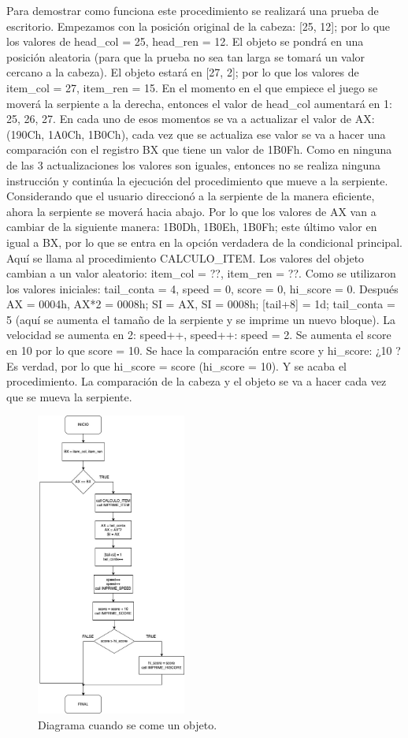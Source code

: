 \documentclass[12pt]{article}
\begin{document}
Para demostrar como funciona este procedimiento se realizará una prueba de escritorio. Empezamos con la posición original de la cabeza: [25, 12]; por lo que los valores de head\_col = 25, head\_ren = 12. El objeto se pondrá en una posición aleatoria (para que la prueba no sea tan larga se tomará un valor cercano a la cabeza). El objeto estará en [27, 2]; por lo que los valores de item\_col = 27, item\_ren = 15. En el momento en el que empiece el juego se moverá la serpiente a la derecha, entonces el valor de head\_col aumentará en 1: 25, 26, 27. En cada uno de esos momentos se va a actualizar el valor de AX: (190Ch, 1A0Ch, 1B0Ch), cada vez que se actualiza ese valor se va a hacer una comparación con el registro BX que tiene un valor de 1B0Fh. Como en ninguna de las 3 actualizaciones los valores son iguales, entonces no se realiza ninguna instrucción y continúa la ejecución del procedimiento que mueve a la serpiente. Considerando que el usuario direccionó a la serpiente de la manera eficiente, ahora la serpiente se moverá hacia abajo. Por lo que los valores de AX van a cambiar de la siguiente manera: 1B0Dh, 1B0Eh, 1B0Fh; este último valor en igual a BX, por lo que se entra en la opción verdadera de la condicional principal. Aquí se llama al procedimiento CALCULO\_ITEM. Los valores del objeto cambian a un valor aleatorio: item\_col = ??, item\_ren = ??. Como se utilizaron los valores iniciales: tail\_conta = 4, speed = 0, score = 0, hi\_score = 0. Después AX = 0004h, AX*2 = 0008h; SI = AX, SI = 0008h; [tail+8] = 1d; tail\_conta = 5 (aquí se aumenta el tamaño de la serpiente y se imprime un nuevo bloque). La velocidad se aumenta en 2: speed++, speed++: speed = 2. Se aumenta el score en 10 por lo que score = 10. Se hace la comparación entre score y hi\_score: ¿10 ? Es verdad, por lo que hi\_score = score (hi\_score = 10). Y se acaba el procedimiento. La comparación de la cabeza y el objeto se va a hacer cada vez que se mueva la serpiente. 

\begin{figure}
    \centering
    \includegraphics[height= 10cm]{img/diagramas/04DiagramaComerObjeto.jpg}
    \caption{Diagrama cuando se come un objeto.}
    \label{fig:comer}
\end{figure}
\end{document}
